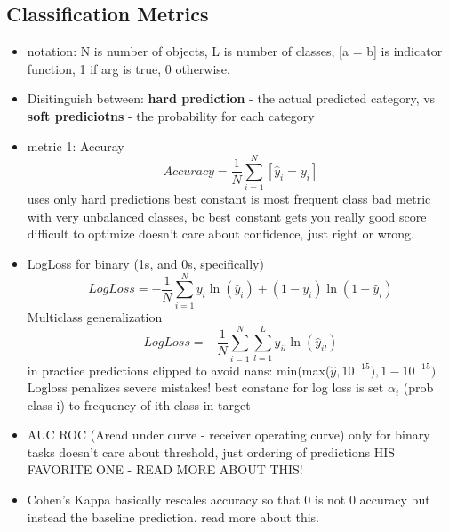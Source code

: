 \documentclass[a4paper]{report}
\begin{document}
\subsection{Classification Metrics}
\begin{itemize}
  \item notation: N is number of objects, L is number of classes, [a = b] is indicator function, 1 if arg is true, 0 otherwise.
  \item Disitinguish between: {\bf hard prediction} - the actual predicted category, vs {\bf soft prediciotns} - the probability for each category
  \item metric 1: Accuray
    \begin{equation}
      Accuracy = \frac{1}{N} \sum_{i=1}^N [\hat{y}_i = y_i]
    \end{equation}
    \subitem uses only hard predictions
    \subitem best constant is most frequent class
    \subitem bad metric with very unbalanced classes, bc best constant gets you really good score
    \subitem difficult to optimize
    \subitem doesn't care about confidence, just right or wrong.
  \item LogLoss
    \subitem for binary (1s, and 0s, specifically)	
    \begin{equation}
      LogLoss = - \frac{1}{N} \sum_{i=1}^N y_i \ln(\hat{y}_i) + (1-y_i)\ln(1-\hat{y}_i)
    \end{equation}	
    \subitem Multiclass generalization
    \begin{equation}
      LogLoss = - \frac{1}{N} \sum_{i=1}^N \sum_{l=1}^L y_{il} \ln(\hat{y}_{il})
    \end{equation}	
    \subitem in practice predictions clipped to avoid nans: min(max($\hat{y}, 10^{-15}), 1-10^{-15})$
    \subitem Logloss penalizes severe mistakes!
    \subitem best constanc for log loss is set $\alpha_i$ (prob class i) to frequency of ith class in target
  \item AUC ROC (Aread under curve - receiver operating curve)
    \subitem only for binary tasks
    \subitem doesn't care about threshold, just ordering of predictions
    \subitem HIS FAVORITE ONE - READ MORE ABOUT THIS!
  \item Cohen's Kappa
    \subitem basically rescales accuracy so that 0 is not 0 accuracy but instead the baseline prediction.
    \subitem read more about this.
\end{itemize}
\end{document}

